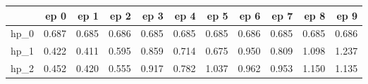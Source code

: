 \begin{tabular}{lrrrrrrrrrr}
\toprule
{} &   ep 0 &   ep 1 &   ep 2 &   ep 3 &   ep 4 &   ep 5 &   ep 6 &   ep 7 &   ep 8 &   ep 9 \\
\midrule
hp\_0 &  0.687 &  0.685 &  0.686 &  0.685 &  0.685 &  0.685 &  0.686 &  0.685 &  0.685 &  0.686 \\
hp\_1 &  0.422 &  0.411 &  0.595 &  0.859 &  0.714 &  0.675 &  0.950 &  0.809 &  1.098 &  1.237 \\
hp\_2 &  0.452 &  0.420 &  0.555 &  0.917 &  0.782 &  1.037 &  0.962 &  0.953 &  1.150 &  1.135 \\
\bottomrule
\end{tabular}
